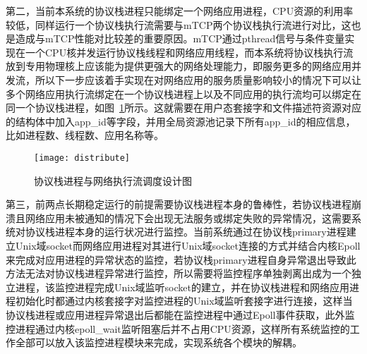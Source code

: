 第二，当前本系统的协议栈进程只能绑定一个网络应用进程，CPU资源的利用率较低，同样运行一个协议栈执行流需要与mTCP两个协议栈执行流进行对比，这也是造成与mTCP性能对比较差的重要原因。mTCP通过pthread信号与条件变量实现在一个CPU核并发运行协议栈线程和网络应用线程，而本系统将协议栈执行流放到专用物理核上应该能为提供更强大的网络处理能力，即服务更多的网络应用并发流，所以下一步应该着手实现在对网络应用的服务质量影响较小的情况下可以让多个网络应用执行流绑定在一个协议栈进程上以及不同应用的执行流均可以绑定在同一个协议栈进程，如图~\ref{fig:distribute}所示。这就需要在用户态套接字和文件描述符资源对应的结构体中加入app\_id等字段，并用全局资源池记录下所有app\_id的相应信息，比如进程数、线程数、应用名称等。

\vspace{-10pt}
\begin{figure}[H] %
  \centering
  \texttt{[image: distribute]}
  \caption{协议栈进程与网络执行流调度设计图}
  \label{fig:distribute}
\end{figure}
\vspace{-10pt}

第三，前两点长期稳定运行的前提需要协议栈进程本身的鲁棒性，若协议栈进程崩溃且网络应用未被通知的情况下会出现无法服务或绑定失败的异常情况，这需要系统对协议栈进程本身的运行状况进行监控。当前系统通过在协议栈primary进程建立Unix域socket而网络应用进程对其进行Unix域socket连接的方式并结合内核Epoll来完成对应用进程的异常状态的监控，若协议栈primary进程自身异常退出导致此方法无法对协议栈进程异常进行监控，所以需要将监控程序单独剥离出成为一个独立进程，该监控进程完成Unix域监听socket的建立，并在协议栈进程和网络应用进程初始化时都通过内核套接字对监控进程的Unix域监听套接字进行连接，这样当协议栈进程或应用进程异常退出后都能在监控进程中通过Epoll事件获取，此外监控进程通过内核epoll\_wait监听阻塞后并不占用CPU资源，这样所有系统监控的工作全部可以放入该监控进程模块来完成，实现系统各个模块的解耦。

